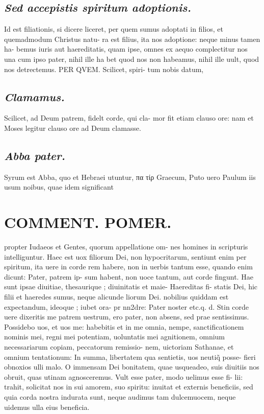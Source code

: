 \documentclass{article}
\begin{document}
\begin{pages}
\subsection*{\textit{Sed accepistis spiritum adoptionis. }}\pstart Id est filiationis, si dicere liceret, per quem sumus adoptati in filios, et quemadmodum Christus natu- ra est filius, ita nos adoptione: neque minus tamen ha- bemus iuris aut haereditatis, quam ipse, omnes ex aequo complectitur nos una cum ipso pater, nihil ille ha bet quod nos non habeamus, nihil ille uult, quod nos detrectemus. PER QVEM. Scilicet, spiri- tum nobis datum,  \pend
{}
{}
\subsection*{\textit{Clamamus. }}\pstart Scilicet, ad Deum patrem, fidelt corde, qui cla- mor fit etiam clauso ore: nam et Moses legitur clauso ore ad Deum clamasse.  \pend
{}
{}
\subsection*{\textit{Abba pater. }}\pstart Syrum est Abba, quo et Hebraei utuntur, πα τίρ Graecum, Puto uero Paulum iis usum noibus, quae idem significant  \pend
\section*{COMMENT. POMER.  }\pstart propter Iudaeos et Gentes, quorum appellatione om- nes homines in scripturis intelliguntur. Haec est uox filiorum Dei, non hypocritarum, sentiunt enim per spiritum, ita uere in corde rem habere, non in uerbis tantum esse, quando enim dicunt: Pater, patrem ip- sum habent, non uoce tantum, aut corde fingunt. Hae sunt ipsae diuitiae, thesaurique ; diuinitatis et maie- Haereditas fi- statis Dei, hic filii et haeredes sumus, neque alicunde liorum Dei. nobilius quiddam est expectandum, ideoque ; iubet ora- pr nn2dre: Pater noster etc.q. d. Stin corde uere dixeritis me patrem uestrum, ero pater, non absens, sed prae sentissimus. Possidebo uos, et uos me: habebitis et in me omnia, nempe, sanctificationem nominis mei, regni mei potentiam, uoluntatis mei agnitionem, omnium necessariarum copiam, peccatorum remissio- nem, uictoriam Sathanae, et omnium tentationum: In summa, libertatem qua sentietis, uos neutiq̃ posse- fieri obnoxios ulli malo. O immensam Dei bonitatem, quae usqueadeo, suis diuitiis nos obruit, quas utinam agnosceremus. Vult esse pater, modo uelimus esse fi- lii: trahit, solicitat nos in sui amorem, suo spiritu: inuitat et externis beneficiis, sed quia corda nostra indurata sunt, neque audimus tam dulcemuocem, neque  uidemus ulla eius beneficia.   \pend
{}
{}

\end{pages}
\end{document}
